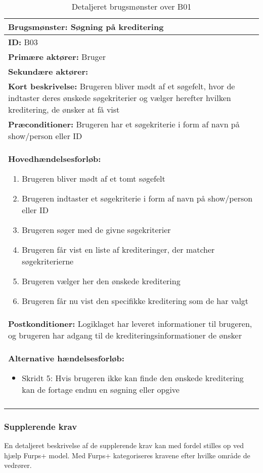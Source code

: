 \begin{longtable}{|p{150mm}|}
\hline
\textbf{Brugsmønster:} Søgning på kreditering\\ \hline
\textbf{ID:} B03         \\ \hline
\textbf{Primære aktører:} Bruger          \\ \hline
\textbf{Sekundære aktører:}        \\ \hline
\textbf{Kort beskrivelse:} Brugeren bliver mødt af et søgefelt, hvor de indtaster deres ønskede søgekriterier og vælger herefter hvilken kreditering, de ønsker at få vist         \\ \hline
\textbf{Præconditioner:} Brugeren har et søgekriterie i form af navn på show/person eller ID        \\ \hline
\textbf{Hovedhændelsesforløb:}
    \begin{enumerate}
    \setlength{\itemsep}{0pt}
        \item Brugeren bliver mødt af et tomt søgefelt
        \item Brugeren indtaster et søgekriterie i form af navn på show/person eller ID
        \item Brugeren søger med de givne søgekriterier
        \item Brugeren får vist en liste af krediteringer, der matcher søgekriterierne
        \item Brugeren vælger her den ønskede kreditering 
        \item Brugeren får nu vist den specifikke kreditering som de har valgt
    \end{enumerate}
\\ \hline
\textbf{Postkonditioner:} Logiklaget har leveret informationer til brugeren, og brugeren har adgang til de krediteringsinformationer de ønsker         \\ \hline
\textbf{Alternative hændelsesforløb:}
\begin{itemize}
    \item Skridt 5: Hvis brugeren ikke kan finde den ønskede kreditering kan de fortage endnu en søgning eller opgive
\end{itemize}\\ \hline
    \caption{Detaljeret brugsmønster over B01}
    \label{tab:Detaljeret_brugsmønsterdiagram_B01}

\end{longtable}

\subsubsection{Supplerende krav}
\label{supplerende_krav_txt}
En detaljeret beskrivelse af de supplerende krav kan med fordel stilles op ved hjælp Furps+ model. Med Furps+ kategoriseres kravene efter hvilke område de vedrører. 



